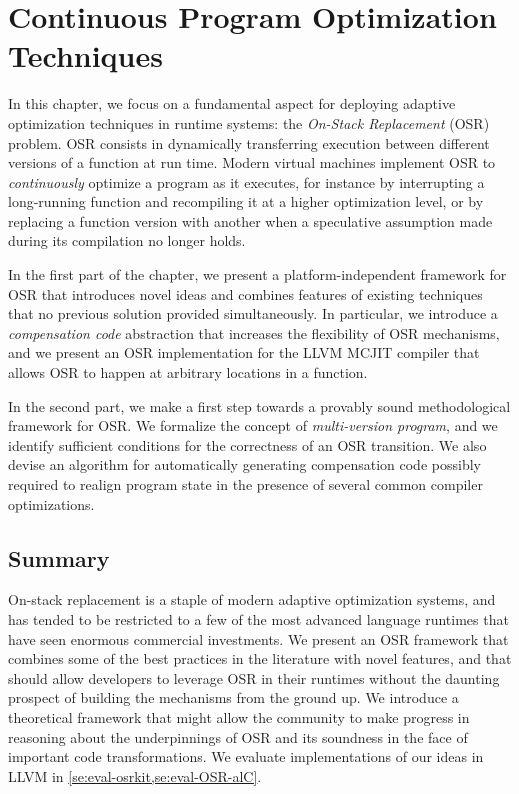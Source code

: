 
\chapter{Continuous Program Optimization Techniques}
\label{ch:continuous}

In this chapter, we focus on a fundamental aspect for deploying adaptive optimization techniques in runtime systems: the {\em On-Stack Replacement} (OSR) problem. OSR consists in dynamically transferring execution between different versions of a function at run time. Modern virtual machines implement OSR to {\em continuously} optimize a program as it executes, for instance by interrupting a long-running function and recompiling it at a higher optimization level, or by replacing a function version with another when a speculative assumption made during its compilation no longer holds.

In the first part of the chapter, we present a platform-independent framework for OSR that introduces novel ideas and combines features of existing techniques that no previous solution provided simultaneously. In particular, we introduce a {\em compensation code} abstraction that increases the flexibility of OSR mechanisms, and we present an OSR implementation for the LLVM MCJIT compiler that allows OSR to happen at arbitrary locations in a function.

In the second part, we make a first step towards a provably sound methodological framework for OSR. We formalize the concept of {\em multi-version program}, and we identify sufficient conditions for the correctness of an OSR transition. We also devise an algorithm for automatically generating compensation code possibly required to realign program state in the presence of several common compiler optimizations.




\section{Summary}
On-stack replacement is a staple of modern adaptive optimization systems, and has tended to be restricted to a few of the most advanced language runtimes that have seen enormous commercial investments. We present an OSR framework that combines some of the best practices in the literature with novel features, and that should allow developers to leverage OSR in their runtimes without the daunting prospect of building the mechanisms from the ground up. We introduce a theoretical framework that might allow the community to make progress in reasoning about the underpinnings of OSR and its soundness in the face of important code transformations. We evaluate implementations of our ideas in LLVM in \mysection\ref{se:eval-osrkit,se:eval-OSR-alC}.